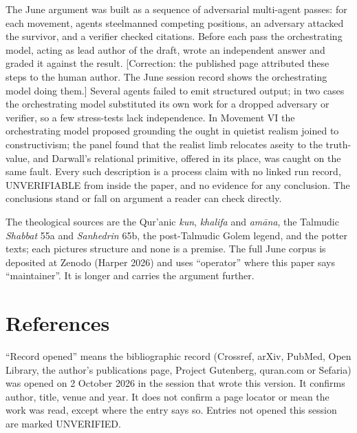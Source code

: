 \documentclass[11pt]{article}
\begin{document}
The June argument was built as a sequence of adversarial multi-agent passes: for each movement, agents steelmanned competing positions, an adversary attacked the survivor, and a verifier checked citations. Before each pass the orchestrating model, acting as lead author of the draft, wrote an independent answer and graded it against the result. [Correction: the published page attributed these steps to the human author. The June session record shows the orchestrating model doing them.] Several agents failed to emit structured output; in two cases the orchestrating model substituted its own work for a dropped adversary or verifier, so a few stress-tests lack independence. In Movement VI the orchestrating model proposed grounding the ought in quietist realism joined to constructivism; the panel found that the realist limb relocates aseity to the truth-value, and Darwall's relational primitive, offered in its place, was caught on the same fault. Every such description is a process claim with no linked run record, UNVERIFIABLE from inside the paper, and no evidence for any conclusion. The conclusions stand or fall on argument a reader can check directly.

The theological sources are the Qur'anic \emph{kun}, \emph{khalifa} and \emph{amāna}, the Talmudic \emph{Shabbat} 55a and \emph{Sanhedrin} 65b, the post-Talmudic Golem legend, and the potter texts; each pictures structure and none is a premise. The full June corpus is deposited at Zenodo (Harper 2026) and uses ``operator'' where this paper says ``maintainer''. It is longer and carries the argument further.

\section*{References}

``Record opened'' means the bibliographic record (Crossref, arXiv, PubMed, Open Library, the author's publications page, Project Gutenberg, quran.com or Sefaria) was opened on 2 October 2026 in the session that wrote this version. It confirms author, title, venue and year. It does not confirm a page locator or mean the work was read, except where the entry says so. Entries not opened this session are marked UNVERIFIED.
\end{document}
